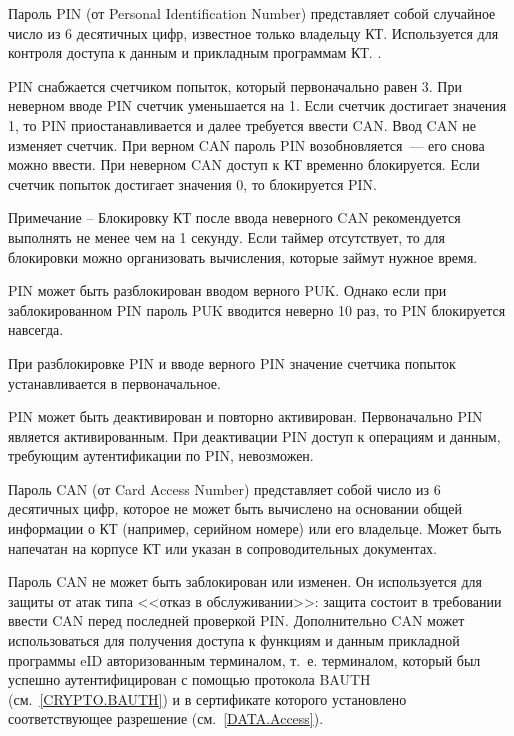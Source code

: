 Пароль PIN (от Personal Identification Number)
представляет собой случайное число из 6 десятичных цифр,
известное только владельцу КТ. Используется для контроля доступа к данным и 
прикладным программам КТ. .

PIN снабжается счетчиком попыток, который первоначально равен 3. При 
неверном вводе PIN счетчик уменьшается на 1. Если счетчик достигает 
значения 1, то PIN приостанавливается и далее требуется ввести CAN. 
Ввод CAN не изменяет счетчик. При верном CAN пароль PIN возобновляется~--- 
его снова можно ввести. При неверном CAN доступ к КТ временно блокируется. 
Если счетчик попыток достигает значения 0, то блокируется PIN. 

\vskip6pt

\begin{note}
Примечание -- Блокировку КТ после ввода неверного CAN рекомендуется выполнять 
не менее чем на 1 секунду. Если таймер отсутствует, то для блокировки можно 
организовать вычисления, которые займут нужное время. 
\end{note}

\vskip6pt

PIN может быть разблокирован вводом верного PUK. Однако если при 
заблокированном PIN пароль PUK вводится неверно 10 раз, то PIN блокируется 
навсегда.

При разблокировке PIN и вводе верного PIN значение счетчика попыток 
устанавливается в первоначальное. 

PIN может быть деактивирован и повторно активирован.
Первоначально PIN является активированным. При деактивации
PIN доступ к операциям и данным, требующим аутентификации по PIN, невозможен.

Пароль CAN (от Card Access Number) представляет собой число из 6 десятичных 
цифр, которое не может быть вычислено на основании общей информации о КТ 
(например, серийном номере) или его владельце. Может быть напечатан на корпусе 
КТ или указан в сопроводительных документах. 

Пароль CAN не может быть заблокирован или изменен. Он используется для защиты 
от атак типа <<отказ в обслуживании>>: защита состоит в требовании ввести CAN перед 
последней проверкой PIN. Дополнительно CAN может использоваться для 
получения доступа к функциям и данным прикладной программы eID 
авторизованным терминалом, т.~е. терминалом, который был успешно 
аутентифицирован с помощью протокола BAUTH (см.~\ref{CRYPTO.BAUTH}) и в 
сертификате которого установлено соответствующее разрешение (см.~\ref{DATA.Access}). 

